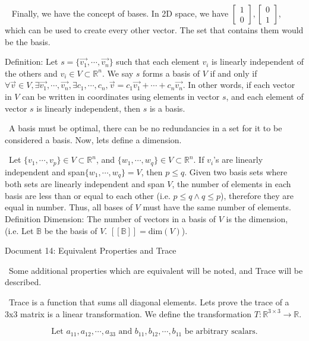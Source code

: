 \documentclass[12pt]{article}
\begin{document}
$\,\,\,$ Finally, we have the concept of bases. In 2D space, we have $\begin{bmatrix}1\\0\end{bmatrix},\begin{bmatrix}0\\1\end{bmatrix}$, which can be used to create every other vector. The set that contains them would be the basis.

Definition: Let $s=\{\vec{v_1},\cdots,\vec{v_n}\}$ such that each element $v_i$ is linearly independent of the others and $v_i\in V\subset\mathbb{R}^n$. We say $s$ forms a basis of $V$ if and only if $\forall \vec{v}\in V,\exists \vec{v_1},\cdots,\vec{v_n},\exists c_1,\cdots,c_n,\vec{v}=c_1\vec{v_1}+\cdots +c_n\vec{v_n}$. In other words, if each vector in $V$ can be written in coordinates using elements in vector $s$, and each element of vector $s$ is linearly independent, then $s$ is a basis.

$\,\,\,$A basis must be optimal, there can be no redundancies in a set for it to be considered a basis. Now, lets define a dimension.

$\,\,\,$Let $\{v_1,\cdots,v_p\}\in V\subset\mathbb{R}^n$, and $\{w_1,\cdots,w_q\}\in V\subset\mathbb{R}^n$. If $v_i$'s are linearly independent and span$\{w_1,\cdots,w_q\}=V$, then $p\leq q$. Given two basis sets where both sets are linearly independent and span $V$, the number of elements in each basis are less than or equal to each other (i.e. $p\leq q\land q\leq p$), therefore they are equal in number. Thus, all bases of $V$ must have the same number of elements.\\

Definition Dimension: The number of vectors in a basis of $V$ is the dimension, (i.e. Let $\mathbb{B}$ be the basis of $V$. $[[\mathbb{B}]]=\text{dim}(V)$).

\newpage
\begin{center}
Document 14: Equivalent Properties and Trace
\end{center}

$\,\,\,$Some additional properties which are equivalent will be noted, and Trace will be described.

$\,\,\,$Trace is a function that sums all diagonal elements. Lets prove the trace of a 3x3 matrix is a linear transformation. We define the transformation $T:\mathbb{R}^{3\times 3}\rightarrow\mathbb{R}$.

$$\text{Let }a_{11},a_{12},\cdots,a_{33} \text{ and } b_{11},b_{12},\cdots,b_{11}\text{ be arbitrary scalars.}$$
\end{document}
